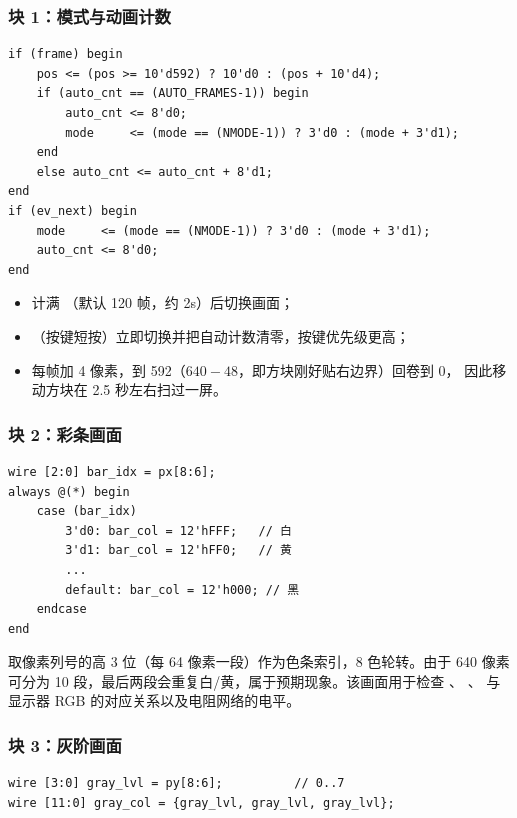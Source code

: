 \subsubsection{块 1：模式与动画计数}

\begin{lstlisting}[style=vsnip]
if (frame) begin
    pos <= (pos >= 10'd592) ? 10'd0 : (pos + 10'd4);
    if (auto_cnt == (AUTO_FRAMES-1)) begin
        auto_cnt <= 8'd0;
        mode     <= (mode == (NMODE-1)) ? 3'd0 : (mode + 3'd1);
    end
    else auto_cnt <= auto_cnt + 8'd1;
end
if (ev_next) begin
    mode     <= (mode == (NMODE-1)) ? 3'd0 : (mode + 3'd1);
    auto_cnt <= 8'd0;
end
\end{lstlisting}

\begin{itemize}[leftmargin=2em,itemsep=1pt]
  \item {} 计满 （默认 120 帧，约 2s）后切换画面；
  \item {}（按键短按）立即切换并把自动计数清零，按键优先级更高；
  \item {} 每帧加 4 像素，到 592（$640-48$，即方块刚好贴右边界）回卷到 0，
        因此移动方块在 2.5 秒左右扫过一屏。
\end{itemize}

\subsubsection{块 2：彩条画面}

\begin{lstlisting}[style=vsnip]
wire [2:0] bar_idx = px[8:6];
always @(*) begin
    case (bar_idx)
        3'd0: bar_col = 12'hFFF;   // 白
        3'd1: bar_col = 12'hFF0;   // 黄
        ...
        default: bar_col = 12'h000; // 黑
    endcase
end
\end{lstlisting}

取像素列号的高 3 位（每 64 像素一段）作为色条索引，8 色轮转。由于 640 像素可分为
10 段，最后两段会重复白/黄，属于预期现象。该画面用于检查 、
\sig{[7:6]}、\sig{[3:2]} 与显示器 RGB 的对应关系以及电阻网络的电平。

\subsubsection{块 3：灰阶画面}

\begin{lstlisting}[style=vsnip]
wire [3:0] gray_lvl = py[8:6];          // 0..7
wire [11:0] gray_col = {gray_lvl, gray_lvl, gray_lvl};
\end{lstlisting}


